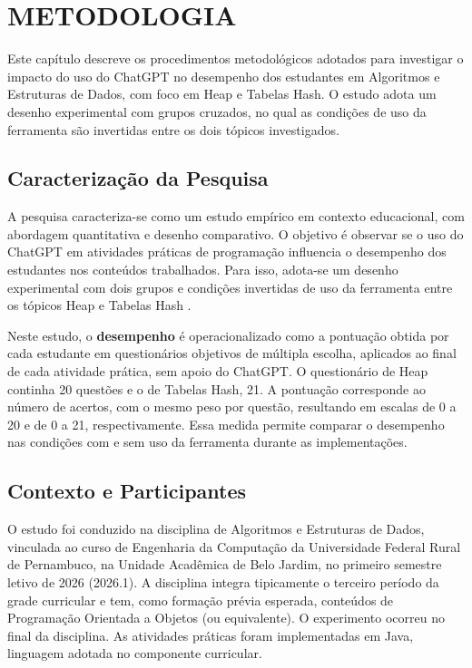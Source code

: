 
\chapter{METODOLOGIA}
\label{chap:metodologia}

Este capítulo descreve os procedimentos metodológicos adotados para investigar o impacto do uso do ChatGPT no desempenho dos estudantes em Algoritmos e Estruturas de Dados, com foco em Heap e Tabelas Hash. O estudo adota um desenho experimental com grupos cruzados, no qual as condições de uso da ferramenta são invertidas entre os dois tópicos investigados.

\section{Caracterização da Pesquisa}
\label{sec:caracterizacao-pesquisa}

A pesquisa caracteriza-se como um estudo empírico em contexto educacional, com abordagem quantitativa e desenho comparativo. O objetivo é observar se o uso do ChatGPT em atividades práticas de programação influencia o desempenho dos estudantes nos conteúdos trabalhados. Para isso, adota-se um desenho experimental com dois grupos e condições invertidas de uso da ferramenta entre os tópicos Heap e Tabelas Hash \cite{wohlin2012experimentation}.

Neste estudo, o \textbf{desempenho} é operacionalizado como a pontuação obtida por cada estudante em questionários objetivos de múltipla escolha, aplicados ao final de cada atividade prática, sem apoio do ChatGPT. O questionário de Heap continha 20 questões e o de Tabelas Hash, 21. A pontuação corresponde ao número de acertos, com o mesmo peso por questão, resultando em escalas de 0 a 20 e de 0 a 21, respectivamente. Essa medida permite comparar o desempenho nas condições com e sem uso da ferramenta durante as implementações.

\section{Contexto e Participantes}
\label{sec:contexto-participantes}

O estudo foi conduzido na disciplina de Algoritmos e Estruturas de Dados, vinculada ao curso de Engenharia da Computação da Universidade Federal Rural de Pernambuco, na Unidade Acadêmica de Belo Jardim, no primeiro semestre letivo de 2026 (2026.1). A disciplina integra tipicamente o terceiro período da grade curricular e tem, como formação prévia esperada, conteúdos de Programação Orientada a Objetos (ou equivalente). O experimento ocorreu no final da disciplina. As atividades práticas foram implementadas em Java, linguagem adotada no componente curricular.

